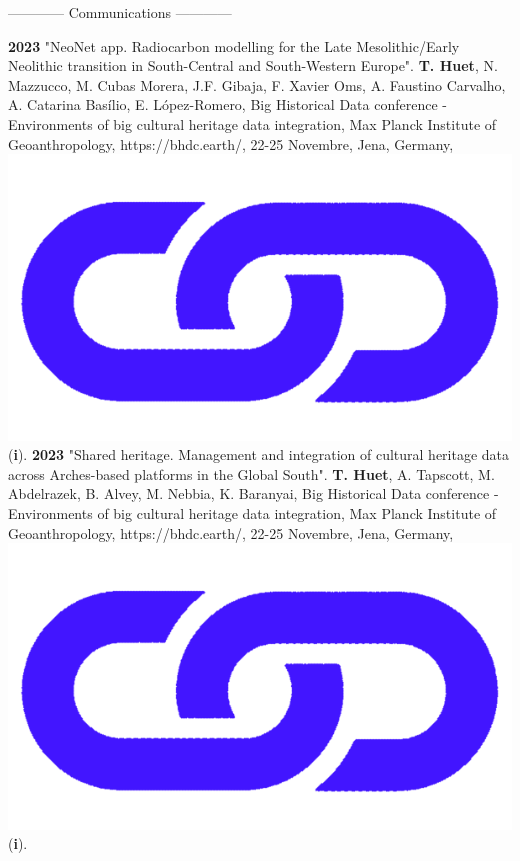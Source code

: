 \documentclass{article}
\begin{document}
\begin{center}------------ Communications ------------\end{center}
\smallbreak
\textbf{2023 }"NeoNet app. Radiocarbon modelling for the Late Mesolithic/Early Neolithic transition in South-Central and South-Western Europe". \textbf{T. Huet}, N. Mazzucco, M. Cubas Morera, J.F. Gibaja, F. Xavier Oms, A. Faustino Carvalho, A. Catarina Basílio, E. López-Romero, Big Historical Data conference - Environments of big cultural heritage data integration, Max Planck Institute of Geoanthropology, https://bhdc.earth/, 22-25 Novembre, Jena, Germany,  \href{https://zoometh.github.io/neonet/doc/talks/2023-bhdc}{\includegraphics[scale=0.02]{link_darkblue.png}} (\textbf{i}).
\smallbreak
\textbf{2023 }"Shared heritage. Management and integration of cultural heritage data across Arches-based platforms in the Global South". \textbf{T. Huet}, A. Tapscott, M. Abdelrazek, B. Alvey, M. Nebbia, K. Baranyai, Big Historical Data conference - Environments of big cultural heritage data integration, Max Planck Institute of Geoanthropology, https://bhdc.earth/, 22-25 Novembre, Jena, Germany,  \href{https://colab.research.google.com/github/achp-project/cultural-heritage/blob/main/presentation/bhdc/rm_compar.ipynb}{\includegraphics[scale=0.02]{link_darkblue.png}} (\textbf{i}).
\end{document}
